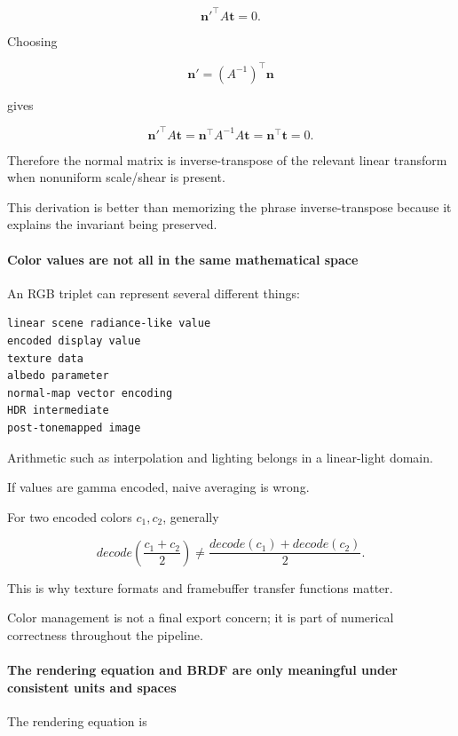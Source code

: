 \[
{\mathbf n'}^\top A\mathbf t=0.
\]

Choosing

\[
\mathbf n'=(A^{-1})^\top\mathbf n
\]

gives

\[
{\mathbf n'}^\top A\mathbf t
=
\mathbf n^\top A^{-1}A\mathbf t
=
\mathbf n^\top\mathbf t
=
0.
\]

Therefore the normal matrix is inverse-transpose of the relevant linear transform when nonuniform scale/shear is present.

This derivation is better than memorizing the phrase inverse-transpose because it explains the invariant being preserved.

\paragraph{Color values are not all in the same mathematical space}\label{color-values-are-not-all-in-the-same-mathematical-space}

An RGB triplet can represent several different things:

\begin{verbatim}
linear scene radiance-like value
encoded display value
texture data
albedo parameter
normal-map vector encoding
HDR intermediate
post-tonemapped image
\end{verbatim}

Arithmetic such as interpolation and lighting belongs in a linear-light domain.

If values are gamma encoded, naive averaging is wrong.

For two encoded colors \(c_1,c_2\), generally

\[
decode\left(
\frac{c_1+c_2}{2}
\right)
\neq
\frac{decode(c_1)+decode(c_2)}{2}.
\]

This is why texture formats and framebuffer transfer functions matter.

Color management is not a final export concern; it is part of numerical correctness throughout the pipeline.

\paragraph{The rendering equation and BRDF are only meaningful under consistent units and spaces}\label{the-rendering-equation-and-brdf-are-only-meaningful-under-consistent-units-and-spaces}

The rendering equation is

